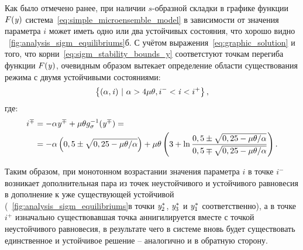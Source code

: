 Как было отмечено ранее, при наличии $s$-образной складки в графике функции $F(\mathit{y})$ система~\eqref{eq:simple_microensemble_model} в зависимости от значения параметра $i$ может иметь одно или два устойчивых состояния, что хорошо видно \onfigure~\ref{fig:analysis_sigm_equilibriums}б. С учётом выражения~\eqref{eq:graphic_solution} и того, что корни~\eqref{eq:sigm_stability_bounds_y} соответстуют точкам перегиба функции $F(\mathit{y})$, очевидным образом вытекает определение области существования режима с двумя устойчивыми состояниями:%
\begin{equation}
    \nonumber
    \left\{(\alpha, \mathit{i})\ |\ \alpha > 4 \mu \theta, i^{-} < \mathit{i} < i^{+}\right\},
\end{equation}
где:
\begin{equation}
    \label{eq:sigm_stability_bounds_i}
    \begin{alignedat}{2}
        i^{\mp} &= -\alpha \mathit{y}^{\mp} + \mu \theta g_{\sigma}^{-1}(\mathit{y}^{\mp}) = \\
                &= -\alpha \left(0,5 \pm \sqrt{0,25 - \mu \theta / \alpha}\right) + \mu \theta \left(3 + \ln\dfrac{0,5 \pm \sqrt{0,25 - \mu \theta / \alpha}}{0,5 \mp \sqrt{0,25 - \mu \theta / \alpha}}\right).
    \end{alignedat}
\end{equation}

Таким образом, при монотонном возрастании значения параметра $i$ в точке $i^{-}$ возникает дополнительная пара из точек неустойчивого и устойчивого равновесия в дополнение к уже существующей устойчивой (\onfigure~\ref{fig:analysis_sigm_equilibriums}в точки $\mathit{y}^{*}_{2}$, $\mathit{y}^{*}_{3}$ и $\mathit{y}^{*}_{1}$ соответственно), а в точке $i^{+}$ изначально существовавшая точка аннигилируется вместе с точкой неустойчивого равновесия, в результате чего в системе вновь будет существовать единственное и устойчивое решение -- аналогично и в обратную сторону.

